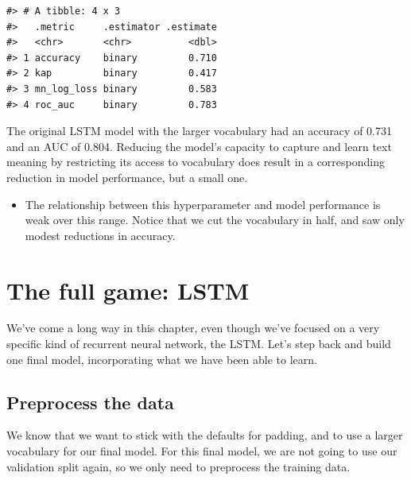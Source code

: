 \documentclass[
]{krantz}
\newenvironment{rmdblock}[1]
  {\begin{shaded*}
  \begin{itemize}[left = -1cm, labelsep = 1cm]
  \renewcommand{\labelitemi}{
    \raisebox{-.7\height}[0pt][0pt]{
      {\setkeys{Gin}{width=3em,keepaspectratio}\texttt{[image: images/\#1]}}
    }
  }
 
  \item
  }
  {
  \end{itemize}
  \end{shaded*}
  }
\newenvironment{rmdnote}
  {\begin{rmdblock}{note}}
  {\end{rmdblock}}
\begin{document}
\begin{verbatim}
#> # A tibble: 4 x 3
#>   .metric     .estimator .estimate
#>   <chr>       <chr>          <dbl>
#> 1 accuracy    binary         0.710
#> 2 kap         binary         0.417
#> 3 mn_log_loss binary         0.583
#> 4 roc_auc     binary         0.783
\end{verbatim}

The original LSTM model with the larger vocabulary had an accuracy of 0.731 and an AUC of 0.804. Reducing the model's capacity to capture and learn text meaning by restricting its access to vocabulary does result in a corresponding reduction in model performance, but a small one.

\begin{rmdnote}
The relationship between this hyperparameter and model performance is
weak over this range. Notice that we cut the vocabulary in half, and saw
only modest reductions in accuracy.
\end{rmdnote}

\hypertarget{lstmfull}{%
\section{The full game: LSTM}\label{lstmfull}}

We've come a long way in this chapter, even though we've focused on a very specific kind of recurrent neural network, the LSTM. Let's step back and build one final model, incorporating what we have been able to learn.

\hypertarget{lstmfullpreprocess}{%
\subsection{Preprocess the data}\label{lstmfullpreprocess}}

We know that we want to stick with the defaults for padding, and to use a larger vocabulary for our final model. For this final model, we are not going to use our validation split again, so we only need to preprocess the training data.
\end{document}
